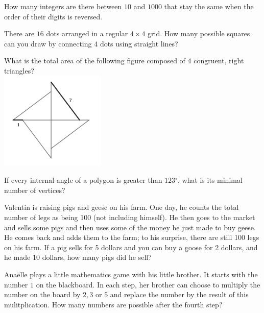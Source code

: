 \documentclass{article}
\newcommand{\degree}{\ensuremath{^{\circ}}}
\begin{document}
\begin{problem}
How many integers are there between $10$ and $1000$ that stay the same when the order of their digits is reversed.
\end{problem}

\begin{problem}
There are $16$ dots arranged in a regular $4\times 4$ grid. How many possible squares can you draw by connecting $4$ dots using straight lines?
\end{problem}

\begin{problem}
What is the total area of the following figure composed of $4$ congruent, right triangles? \\
\includegraphics[width = 5cm]{img6.png}
\end{problem}

\begin{problem}
If every internal angle of a polygon is greater than $123\degree$, what is its minimal number of vertices?
\end{problem}

\begin{problem}
Valentin is raising pigs and geese on his farm. One day, he counts the total number of legs as being 100 (not including himself). He then goes to the market and sells some pigs and then uses some of the money he just made to buy geese. He comes back and adds them to the farm; to his surprise, there are still 100 legs on his farm. If a pig sells for 5 dollars and you can buy a goose for 2 dollars, and he made 10 dollars, how many pigs did he sell?
\end{problem}

\begin{problem}
Anaëlle plays a little mathematics game with his little brother. It starts with the number $1$ on the blackboard. In each step, her brother can choose to multiply the number on the board by $2,3$ or $5$ and replace the number by the result of this mulitplication. How many numbers are possible after the fourth step?  
\end{problem}
\begin{tasks}
\end{tasks}
\end{document}
